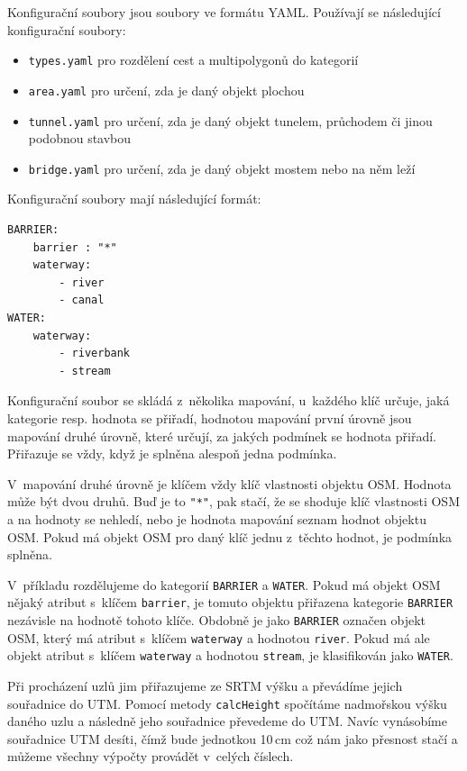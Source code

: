 Konfigurační soubory jsou soubory ve formátu YAML. \cite{yamlspec} Používají se následující
konfigurační soubory:
\begin{itemize}
	\item \verb|types.yaml| pro rozdělení cest a multipolygonů do
kategorií 
	\item \verb|area.yaml| pro určení, zda je daný objekt plochou
	\item \verb|tunnel.yaml| pro určení, zda je daný objekt tunelem,
	průchodem či jinou podobnou stavbou
	\item \verb|bridge.yaml| pro určení, zda je daný objekt mostem nebo na
	něm leží
\end{itemize}

Konfigurační soubory mají následující formát:
\begin{verbatim}
BARRIER: 
    barrier : "*"
    waterway:
        - river
        - canal
WATER:
    waterway:
        - riverbank
        - stream
\end{verbatim}
Konfigurační soubor se skládá z~několika mapování, u~každého klíč určuje, jaká
kategorie resp. hodnota se přiřadí, hodnotou mapování první úrovně jsou mapování
druhé úrovně, které určují, za jakých podmínek se hodnota přiřadí. Přiřazuje se
vždy, když je splněna alespoň jedna podmínka. 

V~mapování druhé úrovně je klíčem vždy klíč vlastnosti objektu OSM. Hodnota může
být dvou druhů. Buď je to \verb|"*"|, pak stačí, že se shoduje klíč vlastnosti
OSM a na hodnoty se nehledí, nebo je hodnota mapování seznam hodnot objektu OSM.
Pokud má objekt OSM pro daný klíč jednu z~těchto hodnot, je  podmínka splněna. 

V~příkladu rozdělujeme do kategorií \verb|BARRIER| a \verb|WATER|. Pokud má
objekt OSM nějaký atribut s~klíčem \verb|barrier|, je tomuto objektu přiřazena
kategorie \verb|BARRIER| nezávisle na hodnotě tohoto klíče. Obdobně je jako
\verb|BARRIER| označen objekt OSM, který má atribut s~klíčem \verb|waterway| a
hodnotou \verb|river|. Pokud má ale objekt atribut s~klíčem \verb|waterway| a
hodnotou \verb|stream|, je klasifikován jako \verb|WATER|.

Při procházení uzlů jim přiřazujeme ze SRTM výšku a převádíme jejich souřadnice
do UTM. Pomocí metody \verb|calcHeight| spočítáme nadmořskou výšku daného uzlu a
následně jeho souřadnice převedeme do UTM. Navíc {\tuc vynásobíme souřadnice UTM
desíti}, čímž bude jednotkou 10\,cm což nám jako přesnost stačí a můžeme všechny
výpočty provádět v~celých číslech.

